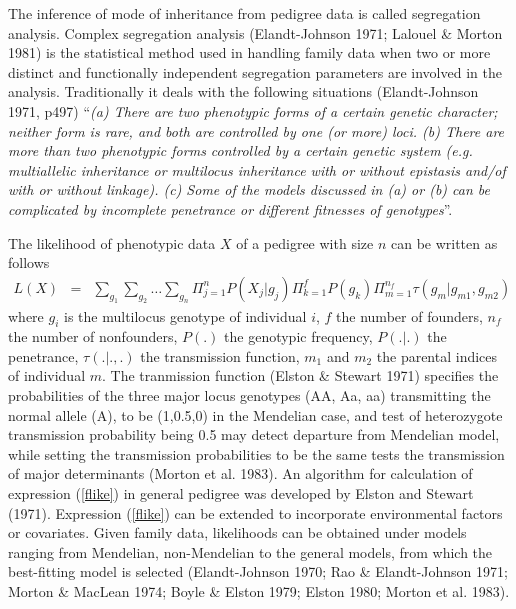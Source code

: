 The inference of mode of inheritance from pedigree data is called segregation
analysis.  Complex segregation analysis (Elandt-Johnson 1971; Lalouel \& Morton
1981) is the statistical method used in handling family data when two or more
distinct and functionally independent segregation parameters are involved in
the analysis.  Traditionally it deals with the following situations
(Elandt-Johnson 1971, p497) ``{\em (a) There are two phenotypic forms of a
certain genetic character; neither form is rare, and both are controlled by one
(or more) loci.  (b) There are more than two phenotypic forms controlled by a
certain genetic system (e.g.  multiallelic inheritance or multilocus
inheritance with or without epistasis and/of with or without linkage).  (c)
Some of the models discussed in (a) or (b) can be complicated by incomplete
penetrance or different fitnesses of genotypes}''.

The likelihood of phenotypic data $X$ of a pedigree with size $n$ can be
written as follows
\begin{eqnarray}
L(X) &=& \sum_{g_1}\sum_{g_2} \ldots \sum_{g_n}
\Pi_{j=1}^nP(X_j|g_j)\Pi_{k=1}^fP(g_k)\Pi_{m=1}^{n_f}\tau(g_m|g_{m1},g_{m2})
\label{flike}
\end{eqnarray}
where $g_i$ is the multilocus genotype of individual $i$, $f$ the number of
founders, $n_f$ the number of nonfounders, $P(.)$ the genotypic frequency,
$P(.|.)$ the penetrance, $\tau(.|.,.)$ the transmission function, $m_1$ and
$m_2$ the parental indices of individual $m$.  The tranmission function (Elston
\& Stewart 1971) specifies the probabilities of the three major locus genotypes
(AA, Aa, aa) transmitting the normal allele (A), to be (1,0.5,0) in the
Mendelian case, and test of heterozygote transmission probability being 0.5 may
detect departure from Mendelian model, while setting the transmission
probabilities to be the same tests the transmission of major determinants
(Morton et al.  1983).  An algorithm for calculation of expression
(\ref{flike}) in general pedigree was developed by Elston and Stewart (1971).
Expression (\ref{flike}) can be extended to incorporate environmental factors
or covariates.  Given family data, likelihoods can be obtained under models
ranging from Mendelian, non-Mendelian to the general models, from which the
best-fitting model is selected (Elandt-Johnson 1970; Rao \& Elandt-Johnson
1971; Morton \& MacLean 1974; Boyle \& Elston 1979; Elston 1980; Morton et al.
1983).

